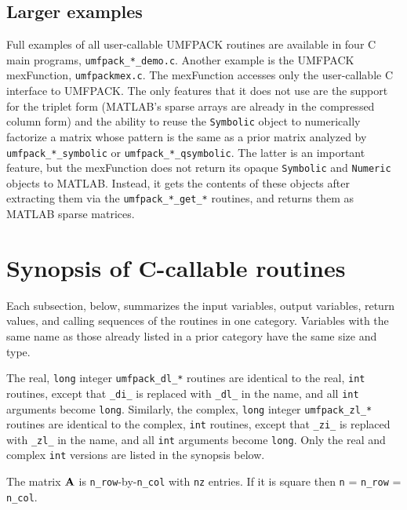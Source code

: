 \subsection{Larger examples}

Full examples of all user-callable UMFPACK routines
are available in four C main programs, {\tt umfpack\_*\_demo.c}.
Another example is
the UMFPACK mexFunction, {\tt umfpackmex.c}.  The mexFunction accesses only the
user-callable C interface to UMFPACK.  The only features that it does not use
are the support for the triplet form (MATLAB's sparse arrays are already in the
compressed column form) and the ability to reuse the {\tt Symbolic} object to
numerically factorize a matrix whose pattern is the same as a prior matrix
analyzed by {\tt umfpack\_*\_symbolic} or {\tt umfpack\_*\_qsymbolic}.  The latter is
an important feature, but the mexFunction does not return its opaque
{\tt Symbolic} and {\tt Numeric} objects to MATLAB.  Instead, it gets the
contents of these objects after extracting them via the {\tt umfpack\_*\_get\_*}
routines, and returns them as MATLAB sparse matrices.

\section{Synopsis of C-callable routines}

Each subsection, below, summarizes the input variables, output variables, return
values, and calling sequences of the routines in one category.  Variables with
the same name as those already listed in a prior category have the same size
and type.

The real, {\tt long} integer {\tt umfpack\_dl\_*} routines are
identical to the real, {\tt int} routines, except that {\tt \_di\_} is replaced
with {\tt \_dl\_} in the name, and all {\tt int} arguments become {\tt long}.
Similarly, the complex, {\tt long} integer {\tt umfpack\_zl\_*} routines are
identical to the complex, {\tt int} routines, except that {\tt \_zi\_} is
replaced
with {\tt \_zl\_} in the name, and all {\tt int} arguments become {\tt long}.
Only the real and complex {\tt int} versions are listed in the synopsis below.

The matrix ${\bf{A}}$ is {\tt n\_row}-by-{\tt n\_col} with {\tt nz} entries.
If it is square then {\tt n} = {\tt n\_row} = {\tt n\_col}.



